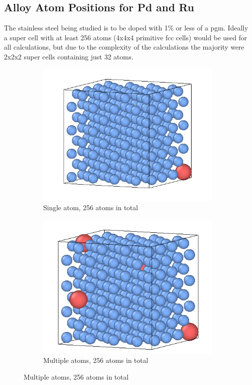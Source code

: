 \FloatBarrier
\subsection{Alloy Atom Positions for Pd and Ru}

The stainless steel being studied is to be doped with 1\% or less of a \acrlong{pgm}.  Ideally a super cell with at least 256 atoms (4x4x4 primitive \acrshort{fcc} cells) would be used for all calculations, but due to the complexity of the calculations the majority were 2x2x2 super cells containing just 32 atoms.

\begin{figure}[htb]
\begin{subfigure}{.42\textwidth}
  \centering
  \includegraphics[width=.94\linewidth]{chapters/potentials_fe_pd_ru/slabs/bulk01.png}  
  \caption{Single atom, 256 atoms in total}
  \label{fig:sub-first}
\end{subfigure}
\begin{subfigure}{.42\textwidth}
  \centering
  \includegraphics[width=.94\linewidth]{chapters/potentials_fe_pd_ru/slabs/bulk02.png}  
  \caption{Multiple atoms, 256 atoms in total}
  \label{fig:sub-first}
\end{subfigure}
\label{fig:binaryalloyconfigurationsbulk}
\end{figure}

